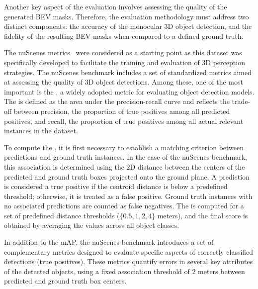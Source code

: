 Another key aspect of the evaluation involves assessing the quality of the generated BEV masks. Therefore, the evaluation methodology must address two distinct components: the accuracy of the monocular 3D object detection, and the fidelity of the resulting BEV masks when compared to a defined ground truth.

The nuScenes metrics~\cite{nuscenes} were considered as a starting point as this dataset was specifically developed to facilitate the training and evaluation of 3D perception strategies. The nuScenes benchmark includes a set of standardized metrics aimed at assessing the quality of 3D object detections. Among these, one of the most important is the , a widely adopted metric for evaluating object detection models. The  is defined as the area under the precision-recall curve and reflects the trade-off between precision, the proportion of true positives among all predicted positives, and recall, the proportion of true positives among all actual relevant instances in the dataset.

To compute the , it is first necessary to establish a matching criterion between predictions and ground truth instances. In the case of the nuScenes benchmark, this association is determined using the 2D distance between the centers of the predicted and ground truth boxes projected onto the ground plane. A prediction is considered a true positive if the centroid distance is below a predefined threshold; otherwise, it is treated as a false positive. Ground truth instances with no associated predictions are counted as false negatives. The  is computed for a set of predefined distance thresholds ($\{0.5, 1, 2, 4\}$ meters), and the final  score is obtained by averaging the  values across all object classes.

In addition to the mAP, the nuScenes benchmark introduces a set of complementary metrics designed to evaluate specific aspects of correctly classified detections (true positives). These metrics quantify errors in several key attributes of the detected objects, using a fixed association threshold of $2$ meters between predicted and ground truth box centers.

